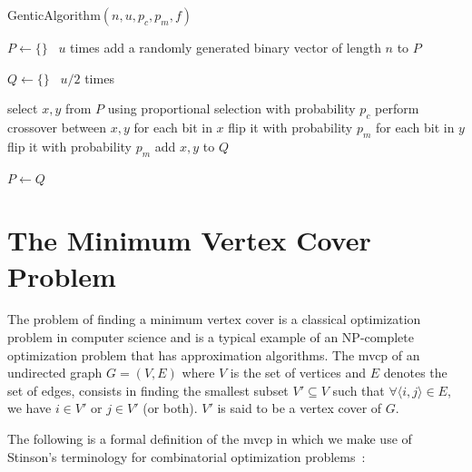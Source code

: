 \documentclass[12pt]{article}
\begin{document}
\begin{algorithm}
\caption{GenticAlgorithm$\left( n, u, p_c, p_m, f \right)$}
\label{alg:ga}

\begin{algorithmic}[1]


\State $ P \gets \{ \} $
\Loop \ $u$ times
\State add a randomly generated binary vector of length $n$ to $P$
\EndLoop

\State $Q \gets \{ \}$
\Loop \ $u/2$ times

\State select $x, y$ from $P$ using proportional selection
\State with probability $p_c$ perform crossover between $x, y$
\label{alg:crossover}
\State for each bit in $x$ flip it with probability $p_m$
\label{alg:m1}
\State for each bit in $y$ flip it with probability $p_m$
\label{alg:m2}
\State add $x, y$ to $Q$

\EndLoop

\State $P \gets Q$
\EndWhile


\end{algorithmic}

\end{algorithm}



\section{The Minimum Vertex Cover Problem}
The problem of finding a minimum vertex cover is a classical
optimization problem in computer science and is a typical
example of an NP-complete optimization problem \cite{wolfram:mvc}
that has approximation algorithms.
The mvcp of an undirected graph $G = (V, E)$ where $V$ is
the set of vertices and $E$ denotes the set of edges,
consists in finding the smallest subset $V' \subseteq V$ such that
$\forall \langle i, j \rangle \in E$, we have $i \in V'$ or $j \in V'$ (or both).
$V'$ is said to be a vertex cover of $G$.

The following is a formal definition of
the mvcp in which we make use of Stinson's terminology
for combinatorial optimization problems~\cite{14:mvcp}:
\end{document}
